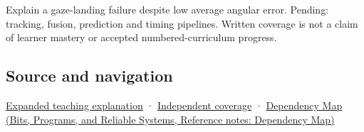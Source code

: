 Explain a gaze-landing failure despite low average angular error. Pending: tracking, fusion, prediction and timing pipelines. Written coverage is not a claim of learner mastery or accepted numbered-curriculum progress.

\subsection{Source and navigation}\label{appendix-a6f2c4fe1996-source-and-navigation}

\hyperref[04-visual-computing-ii-ch042-a-gaze-sample-needs-a-time-as-well-as-a-direction]{Expanded teaching explanation} · \hyperref[appendix-fd090d982a15-xr01---independent-seeing-and-representation-source]{Independent coverage} · \href{../01-Bits-Programs-and-Reliable-Systems/main.pdf\#nameddest=appendix-4ad47bdd269a}{Dependency Map (Bits, Programs, and Reliable Systems, Reference notes: Dependency Map)}

